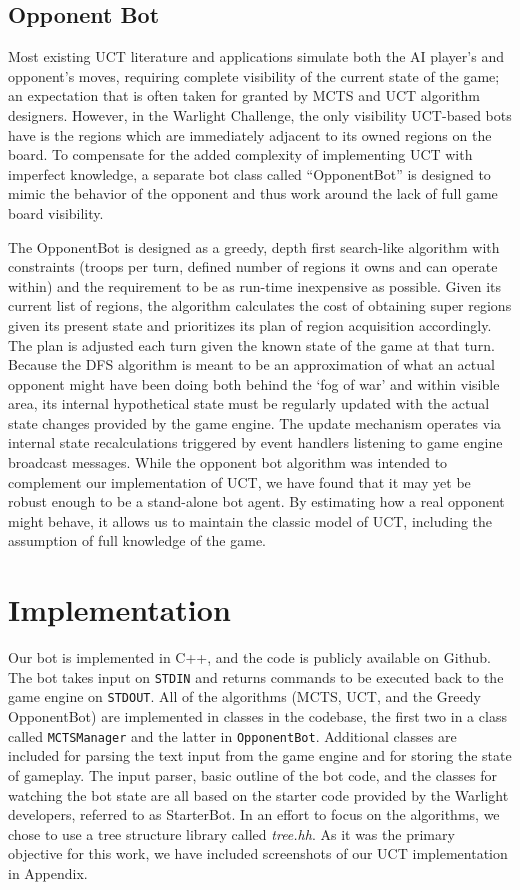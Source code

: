 \documentclass[a4paper,11pt]{article}
\newcommand{\code}[1]{\texttt{#1}}
\begin{document}
\subsection{Opponent Bot}\label{sec:oppbot}
Most existing UCT literature and applications simulate both the AI player's and opponent's
moves, requiring complete visibility of the current state of the game; an expectation that
is often taken for granted by MCTS and UCT algorithm designers. However, in the Warlight 
Challenge, the only visibility UCT-based bots have is the regions which are immediately 
adjacent to its owned regions on the board. To compensate for the added complexity of 
implementing UCT with imperfect knowledge, a separate bot class called ``OpponentBot'' is 
designed to mimic the behavior of the opponent and thus work around the lack of full game 
board visibility.

The OpponentBot is designed as a greedy, depth first search-like algorithm with constraints 
(troops per turn, defined number of regions it owns and can operate within) and the requirement 
to be as run-time inexpensive as possible. Given its current list of regions, the algorithm calculates
the cost of obtaining super regions given its present state and prioritizes its plan of
region acquisition accordingly. The plan is adjusted each turn given the known state of the 
game at that turn. Because the DFS algorithm is meant to be an approximation of what an
actual opponent might have been doing both behind the `fog of war' and within visible area, 
its internal hypothetical state must be regularly updated with the actual state changes
provided by the game engine.  The update mechanism operates via internal state recalculations 
triggered by event handlers listening to game engine broadcast messages. While the
opponent bot algorithm was intended to complement our implementation of UCT, we have found 
that it may yet be robust enough to be a stand-alone bot agent. By estimating how a real 
opponent might behave, it allows us to maintain the classic model of UCT, including the 
assumption of full knowledge of the game.

\section{Implementation}\label{sec:impl}
Our bot is implemented in C++, and the code is publicly available on Github\cite{github}.  
The bot takes input on \code{STDIN} and returns commands to be executed back to the game 
engine on \code{STDOUT}.  All of the algorithms (MCTS, UCT, and the Greedy OpponentBot) are 
implemented in classes in the codebase, the first two in a class called \code{MCTSManager} 
and the latter in \code{OpponentBot}.  Additional classes are included for parsing the text 
input from the game engine and for storing the state of gameplay.  The input parser, basic 
outline of the bot code, and the classes for watching the bot state are all based on the 
starter code provided by the Warlight developers, referred to as StarterBot.  In an effort
to focus on the algorithms, we chose to use a tree structure library called \emph{tree.hh}\cite{treehh}.
As it was the primary objective for this work, we have included screenshots of our UCT
implementation in Appendix.  %
\end{document}
